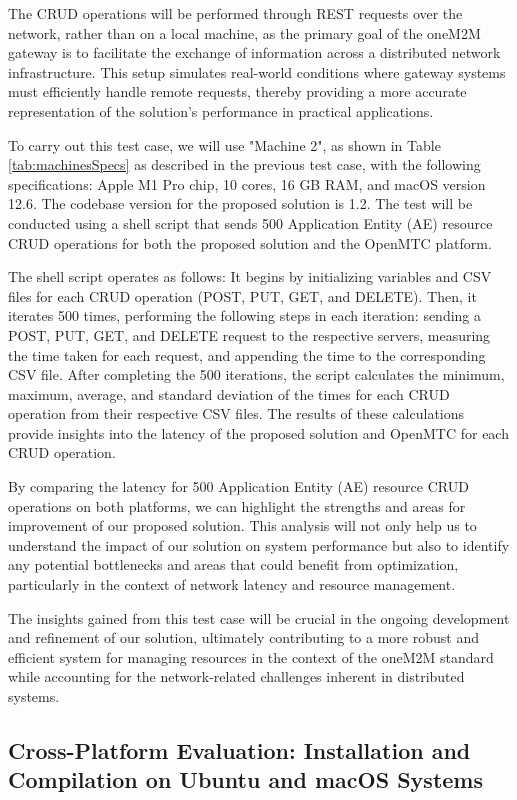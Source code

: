 \documentclass[a4paper,fleqn]{cas-dc}
\begin{document}
The CRUD operations will be performed through REST requests over the network, rather than on a local machine, as the primary goal of the oneM2M gateway is to facilitate the exchange of information across a distributed network infrastructure. This setup simulates real-world conditions where gateway systems must efficiently handle remote requests, thereby providing a more accurate representation of the solution's performance in practical applications.

To carry out this test case, we will use "Machine 2", as shown in Table \ref{tab:machinesSpecs} as described in the previous test case, with the following specifications: Apple M1 Pro chip, 10 cores, 16 GB RAM, and macOS version 12.6. The codebase version for the proposed solution is 1.2. The test will be conducted using a shell script that sends 500 Application Entity (AE) resource CRUD operations for both the proposed solution and the OpenMTC platform.

The shell script operates as follows: It begins by initializing variables and CSV files for each CRUD operation (POST, PUT, GET, and DELETE). Then, it iterates 500 times, performing the following steps in each iteration: sending a POST, PUT, GET, and DELETE request to the respective servers, measuring the time taken for each request, and appending the time to the corresponding CSV file. After completing the 500 iterations, the script calculates the minimum, maximum, average, and standard deviation of the times for each CRUD operation from their respective CSV files. The results of these calculations provide insights into the latency of the proposed solution and OpenMTC for each CRUD operation.

By comparing the latency for 500 Application Entity (AE) resource CRUD operations on both platforms, we can highlight the strengths and areas for improvement of our proposed solution. This analysis will not only help us to understand the impact of our solution on system performance but also to identify any potential bottlenecks and areas that could benefit from optimization, particularly in the context of network latency and resource management.

The insights gained from this test case will be crucial in the ongoing development and refinement of our solution, ultimately contributing to a more robust and efficient system for managing resources in the context of the oneM2M standard while accounting for the network-related challenges inherent in distributed systems.

\subsection{Cross-Platform Evaluation: Installation and Compilation on Ubuntu and macOS Systems}
\end{document}
